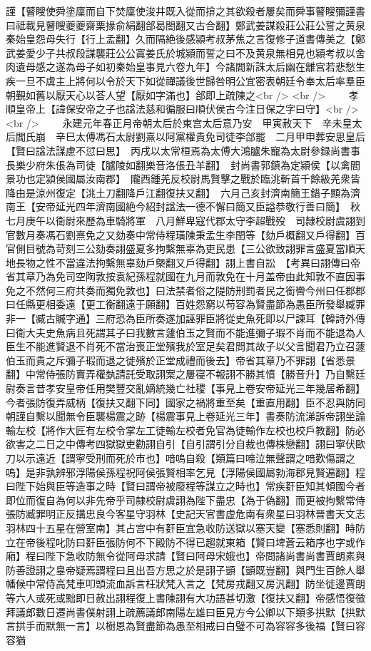 謹【瞽瞍使舜塗廩而自下焚廩使浚井既入從而揜之其欲殺者屢矣而舜事瞽瞍彌謹書曰祗載見瞽瞍夔夔齋栗掾俞絹翻郃曷閤翻又古合翻】鄭武姜謀殺莊公莊公誓之黄泉秦始皇怨母失行【行上孟翻】久而隔絶後感潁考叔茅焦之言復修子道書傳美之【鄭武姜愛少子共叔段謀襲莊公公寘姜氏於城潁而誓之曰不及黄泉無相見也潁考叔以舍肉遺母感之遂為母子如初秦始皇事見六卷九年】今諸閻新誅太后幽在離宫若悲愁生疾一旦不虞主上將何以令於天下如從禪議後世歸咎明公宜密表朝廷令奉太后率羣臣朝覲如舊以厭天心以荅人望【厭如字滿也】郃即上疏陳之<br />
<br />
　　孝順皇帝上【諱保安帝之子也諡法慈和徧服曰順伏侯古今注日保之字曰守】<br />
<br />
　　永建元年春正月帝朝太后於東宫太后意乃安　甲寅赦天下　辛未皇太后閻氏崩　辛巳太傅馮石太尉劉熹以阿黨權貴免司徒李郃罷　二月甲申葬安思皇后【賢曰諡法謀慮不愆曰思】　丙戌以太常桓焉為太傅大鴻臚朱寵為太尉參録尚書事長樂少府朱倀為司徒【臚陵如翻樂音洛倀丑羊翻】　封尚書郭鎮為定潁侯【以禽閻景功也定潁侯國屬汝南郡】　隴西鍾羌反校尉馬賢擊之戰於臨洮斬首千餘級羌衆皆降由是涼州復定【洮土刀翻降戶江翻復扶又翻】　六月己亥封濟南簡王錯子顯為濟南王【安帝延光四年濟南國絶今紹封諡法一德不懈曰簡又臣謚恭敬行善曰簡】　秋七月庚午以衛尉來歷為車騎將軍　八月鮮卑寇代郡太守李超戰歿　司隸校尉虞詡到官數月奏馮石劉熹免之又劾奏中常侍程璜陳秉孟生李閏等【劾戶概翻又戶得翻】百官側目號為苛刻三公劾奏詡盛夏多拘繫無辜為吏民患【三公欲致詡罪言盛夏當順天地長物之性不當違法拘繫無辜劾戶槩翻又戶得翻】詡上書自訟　【考異曰詡傳曰帝省其章乃為免司空陶敦按袁紀孫程就國在九月而敦免在十月盖帝由此知敦不直因事免之不然何三府共奏而獨免敦也】曰法禁者俗之隄防刑罰者民之銜轡今州曰任郡郡曰任縣更相委遠【更工衡翻遠于願翻】百姓怨窮以苟容為賢盡節為愚臣所發舉臧罪非一【臧古贓字通】三府恐為臣所奏遂加誣罪臣將從史魚死即以尸諫耳【韓詩外傳曰衛大夫史魚病且死謂其子曰我數言蘧伯玉之賢而不能進彌子瑕不肖而不能退為人臣生不能進賢退不肖死不當治喪正堂殯我於室足矣君問其故子以父言聞君乃立召蘧伯玉而貴之斥彌子瑕而退之徙殯於正堂成禮而後去】帝省其章乃不罪詡【省悉景翻】中常侍張防賣弄權埶請託受取詡案之屢寑不報詡不勝其憤【勝音升】乃自繫廷尉奏言昔孝安皇帝任用樊豐交亂嫡統幾亡社稷【事見上卷安帝延光三年幾居希翻】今者張防復弄威柄【復扶又翻下同】國家之禍將重至矣【重直用翻】臣不忍與防同朝謹自繫以聞無令臣襲楊震之跡【楊震事見上卷延光三年】書奏防流涕訴帝詡坐論輸左校【將作大匠有左校令掌左工徒輸左校者免官為徒輸作左校也校戶教翻】防必欲害之二日之中傳考四獄獄吏勸詡自引【自引謂引分自裁也傳株戀翻】詡曰寧伏歐刀以示遠近【謂寧受刑而死於市也】喑嗚自殺【類篇曰啼泣無聲謂之喑歎傷謂之嗚】是非孰辨邪浮陽侯孫程祝阿侯張賢相率乞見【浮陽侯國屬勃海郡見賢遍翻】程曰陛下始與臣等造事之時【賢曰謂帝被廢程等謀立之時也】常疾姧臣知其傾國今者即位而復自為何以非先帝乎司隸校尉虞詡為陛下盡忠【為于偽翻】而更被拘繫常侍張防臧罪明正反搆忠良今客星守羽林【史記天官書虚危南有衆星曰羽林晉書天文志羽林四十五星在營室南】其占宫中有姧臣宜急收防送獄以塞天變【塞悉則翻】時防立在帝後程叱防曰姧臣張防何不下殿防不得已趨就東箱【賢曰埤蒼云箱序也字或作廂】程曰陛下急收防無令從阿母求請【賢曰阿母宋娥也】帝問諸尚書尚書賈朗素與防善證詡之辠帝疑焉謂程曰且出吾方思之於是詡子顗【顗既豈翻】與門生百餘人舉幡候中常侍高梵車叩頭流血訴言枉狀梵入言之【梵房戎翻又房汎翻】防坐徙邊賈朗等六人或死或黜即日赦出詡程復上書陳詡有大功語甚切激【復扶又翻】帝感悟復徵拜議郎數日遷尚書僕射詡上疏薦議郎南陽左雄曰臣見方今公卿以下類多拱默【拱默言拱手而默無一言】以樹恩為賢盡節為愚至相戒曰白璧不可為容容多後福【賢曰容容猶